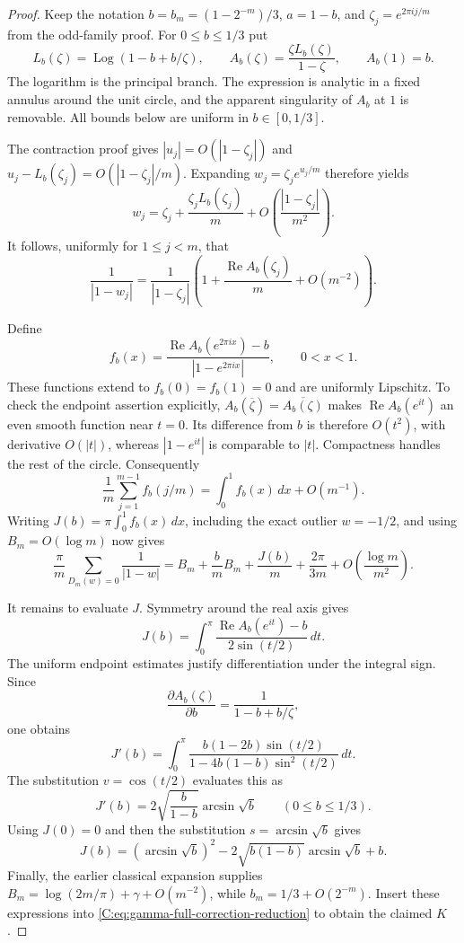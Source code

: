 \documentclass[11pt,a4paper]{article}
\theoremstyle{definition}
\theoremstyle{remark}
\numberwithin{equation}{section}
\begin{document}
\begin{proof}
Keep the notation $b=b_m=(1-2^{-m})/3$, $a=1-b$, and
$\zeta_j=e^{2\pi i j/m}$ from the odd-family proof.  For
$0\le b\le1/3$ put
\[
 L_b(\zeta)=\operatorname{Log}(1-b+b/\zeta),\qquad
 A_b(\zeta)=\frac{\zeta L_b(\zeta)}{1-\zeta},\qquad A_b(1)=b.
\]
The logarithm is the principal branch.  The expression is analytic in
a fixed annulus around the unit circle, and the apparent singularity of
$A_b$ at $1$ is removable.  All bounds below are uniform in
$b\in[0,1/3]$.

The contraction proof gives $|u_j|=O(|1-\zeta_j|)$ and
$u_j-L_b(\zeta_j)=O(|1-\zeta_j|/m)$.  Expanding
$w_j=\zeta_j e^{u_j/m}$ therefore yields
\[
 w_j=\zeta_j+\frac{\zeta_jL_b(\zeta_j)}m
                 +O\!\left(\frac{|1-\zeta_j|}{m^2}\right).
\]
It follows, uniformly for $1\le j<m$, that
\[
 \frac1{|1-w_j|}
 =\frac1{|1-\zeta_j|}
 \left(1+\frac{\operatorname{Re}A_b(\zeta_j)}m+O(m^{-2})\right).
\]

Define
\[
 f_b(x)=\frac{\operatorname{Re}A_b(e^{2\pi i x})-b}
                    {|1-e^{2\pi i x}|},\qquad 0<x<1.
\]
These functions extend to $f_b(0)=f_b(1)=0$ and are uniformly
Lipschitz.  To check the endpoint assertion explicitly,
$A_b(\overline\zeta)=\overline{A_b(\zeta)}$ makes
$\operatorname{Re}A_b(e^{it})$ an even smooth function near $t=0$.
Its difference from $b$ is therefore $O(t^2)$, with derivative
$O(|t|)$, whereas $|1-e^{it}|$ is comparable to $|t|$.
Compactness handles the rest of the circle.  Consequently
\[
 \frac1m\sum_{j=1}^{m-1}f_b(j/m)=\int_0^1 f_b(x)\,dx+O(m^{-1}).
\]
Writing $J(b)=\pi\int_0^1f_b(x)\,dx$, including the exact outlier
$w=-1/2$, and using $B_m=O(\log m)$ now gives
\begin{equation}\label{C:eq:gamma-full-correction-reduction}
 \frac\pi m\sum_{D_m(w)=0}\frac1{|1-w|}
 =B_m+\frac{b}{m}B_m+\frac{J(b)}m+\frac{2\pi}{3m}
       +O\!\left(\frac{\log m}{m^2}\right).
\end{equation}

It remains to evaluate $J$.  Symmetry around the real axis gives
\[
 J(b)=\int_0^\pi
 \frac{\operatorname{Re}A_b(e^{it})-b}{2\sin(t/2)}\,dt.
\]
The uniform endpoint estimates justify differentiation under the
integral sign.  Since
\[
 \frac{\partial A_b(\zeta)}{\partial b}
       =\frac1{1-b+b/\zeta},
\]
one obtains
\[
 J'(b)=\int_0^\pi
 \frac{b(1-2b)\sin(t/2)}{1-4b(1-b)\sin^2(t/2)}\,dt.
\]
The substitution $v=\cos(t/2)$ evaluates this as
\[
 J'(b)=2\sqrt{\frac b{1-b}}\arcsin\sqrt b
        \qquad(0\le b\le1/3).
\]
Using $J(0)=0$ and then the substitution $s=\arcsin\sqrt b$ gives
\[
 J(b)=(\arcsin\sqrt b)^2
       -2\sqrt{b(1-b)}\arcsin\sqrt b+b.
\]
Finally, the earlier classical expansion supplies
$B_m=\log(2m/\pi)+\gamma+O(m^{-2})$, while
$b_m=1/3+O(2^{-m})$.  Insert these expressions into
\eqref{C:eq:gamma-full-correction-reduction} to obtain the claimed $K$.
\end{proof}
\end{document}
